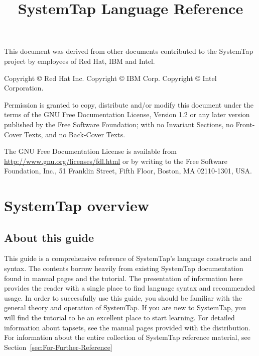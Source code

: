 \documentclass[twoside,english]{article}
\begin{document}
\title{SystemTap Language Reference}

\maketitle
\newpage{}
This document was derived from other documents contributed to the SystemTap project by employees of Red Hat, IBM and Intel.\newline

Copyright \copyright{} Red Hat Inc.\newline
Copyright \copyright{} IBM Corp.\newline
Copyright \copyright{} Intel Corporation.\newline

Permission is granted to copy, distribute and/or modify this document
under the terms of the GNU Free Documentation License, Version 1.2
or any later version published by the Free Software Foundation;
with no Invariant Sections, no Front-Cover Texts, and no Back-Cover Texts.\newline

The GNU Free Documentation License is available from 
\url{http://www.gnu.org/licenses/fdl.html} or by writing to
the Free Software Foundation, Inc., 51 Franklin Street,
Fifth Floor, Boston, MA 02110-1301, USA.
\newpage{}
\tableofcontents{}
\listoftables
\newpage{}

\section{SystemTap overview\label{sec:SystemTap-Overview}}

\subsection{About this guide}

This guide is a comprehensive reference of SystemTap's language constructs
and syntax. The contents borrow heavily from existing SystemTap documentation
found in manual pages and the tutorial. The presentation of information here
provides the reader with a single place to find language syntax and recommended
usage. In order to successfully use this guide, you should be familiar with
the general theory and operation of SystemTap. If you are new to SystemTap,
you will find the tutorial to be an excellent place to start learning. For
detailed information about tapsets, see the manual pages provided with the
distribution. For information about the entire collection of SystemTap reference
material, see Section~\ref{sec:For-Further-Reference} 
\end{document}
